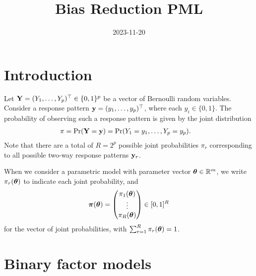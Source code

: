 \documentclass[
]{article}
\title{Bias Reduction PML}
\author{}
\date{\vspace{-2.5em}2023-11-20}
\begin{document}
\maketitle

\newcommand{\pimod}[1]{\pi_{#1}(\btheta)}
\newcommand{\Sigmaystar}{\bSigma_{\by^*}}
\newcommand{\pl}{\operatorname{\ell_P}}
\newcommand{\mlepl}{\hat\btheta_{\text{PL}}}
\newcommand{\mle}{\hat\btheta_{\text{ML}}}
\newcommand{\pimodpl}{\pi_{y_iy_j}^{(ij)}(\btheta)}
\newcommand{\tr}{\operatorname{tr}}

\hypertarget{introduction}{%
\section{Introduction}\label{introduction}}

Let \({\mathbf Y} = (Y_1, \dots, Y_p)^\top \in \{0,1\}^p\) be a vector of
Bernoulli random variables. Consider a response pattern
\({\mathbf y} = (y_1,\dots,y_p)^\top\), where each \(y_i\in\{0,1\}\). The
probability of observing such a response pattern is given by the joint
distribution \begin{align}\label{eq:jointprob1}
\pi
&= \Pr({\mathbf Y} = {\mathbf y})  = \Pr(Y_1=y_1,\dots,Y_p=y_p).
\end{align} Note that there are a total of \(R=2^p\) possible joint
probabilities \(\pi_r\) corresponding to all possible two-way response
patterns \({\mathbf y}_r\).

When we consider a parametric model with parameter vector
\({\boldsymbol\theta}\in\mathbb{R}^m\), we write \(\pi_r({\boldsymbol\theta})\) to indicate each joint
probability, and \begin{equation}\label{eq:jointprob2}
{\boldsymbol\pi}({\boldsymbol\theta}) = \begin{pmatrix}
\pi_{1}({\boldsymbol\theta}) \\
\vdots \\
\pi_{R}({\boldsymbol\theta})  \\
\end{pmatrix} \in [0,1]^R
\end{equation} for the vector of joint probabilities, with
\(\sum_{r=1}^R \pi_{r}({\boldsymbol\theta}) =1\).

\hypertarget{binary-factor-models}{%
\section{Binary factor models}\label{binary-factor-models}}
\end{document}
